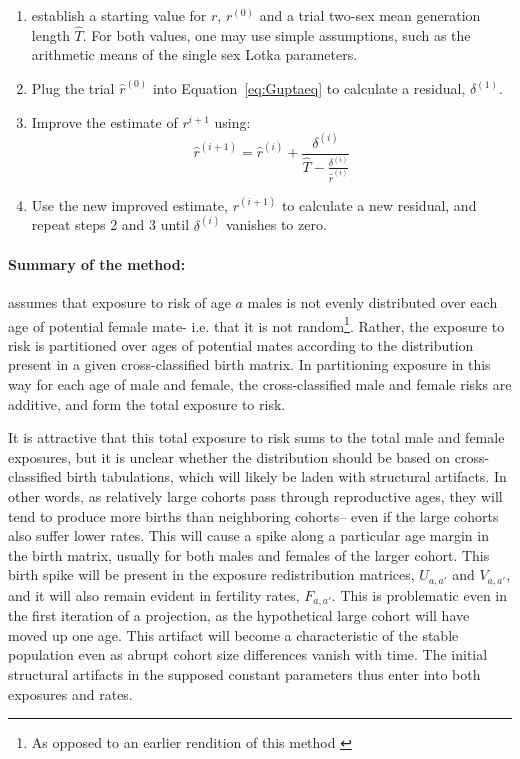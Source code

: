\begin{enumerate}
  \item establish a starting value for $r$,
$r^{(0)}$ and a trial two-sex mean generation length
$\widehat{T}$. For both values, one may use simple
assumptions, such as the arithmetic means of the single sex Lotka parameters.
  \item Plug the trial $\widehat{r}^{(0)}$ into Equation~\eqref{eq:Guptaeq}
  to calculate a residual, $\delta ^{(1)}$.
  \item Improve the estimate of $r^{i+1}$ using:
  \begin{equation}
  \widehat{r}^{(i+1)} = \widehat{r}^{(i)} + \frac{\delta^{(i)}}{\widehat{T} -
\frac{\delta ^{(i)}}{\widehat{r}^{(i)} }}
  \end{equation}
  \item Use the new improved estimate, $r^{(i+1)}$ to calculate a new residual,
  and repeat steps 2 and 3 until $\delta^{(i)}$ vanishes to zero.
\end{enumerate}

\paragraph{Summary of the method: } \citet{gupta1978alternative} assumes that exposure to risk of
 age $a$ males is not evenly distributed over each age of potential female mate-
 i.e. that it is not random\footnote{As opposed to an earlier rendition of
 this method \citep{gupta1972two}}. Rather, the exposure to risk is partitioned
 over ages of potential mates according to the distribution present in a given 
 cross-classified birth matrix. In partitioning exposure in this way for each
 age of male and female, the cross-classified male and female risks are additive, and
 form the total exposure to risk. 
 
 It is attractive that this total exposure to
 risk sums to the total male and female exposures, but it is unclear whether the
 distribution should be based on cross-classified birth tabulations, which will
 likely be laden with structural artifacts. In other words, as relatively large
 cohorts pass through reproductive ages, they will tend to produce more births
 than neighboring cohorts-- even if the large cohorts also suffer lower rates.
 This will cause a spike along a particular age margin in the birth matrix,
 usually for both males and females of the larger cohort. This birth spike will
 be present in the exposure redistribution matrices, $U_{a,a'}$ and
 $V_{a,a'}$, and it will also remain evident in fertility rates, $F_{a,a'}$.
 This is problematic even in the first iteration of a projection, as the
 hypothetical large cohort will have moved up one age. This artifact will
become a characteristic of the stable population even as abrupt cohort size
differences vanish with time. The initial structural artifacts in the supposed
constant parameters thus enter into both exposures and rates. 

